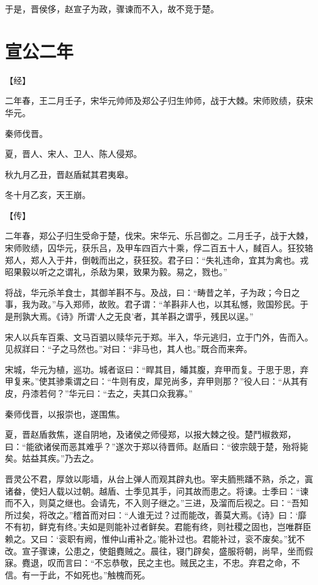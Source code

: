 \documentclass[a4paper,12pt,UTF8,twoside]{ctexbook}
\begin{document}
于是，晋侯侈，赵宣子为政，骤谏而不入，故不竞于楚。


\section{宣公二年}




【经】

二年春，王二月壬子，宋华元帅师及郑公子归生帅师，战于大棘。宋师败绩，获宋华元。

秦师伐晋。

夏，晋人、宋人、卫人、陈人侵郑。

秋九月乙丑，晋赵盾弑其君夷皋。

冬十月乙亥，天王崩。

【传】

二年春，郑公子归生受命于楚，伐宋。宋华元、乐吕御之。二月壬子，战于大棘，宋师败绩，囚华元，获乐吕，及甲车四百六十乘，俘二百五十人，馘百人。狂狡辂郑人，郑人入于井，倒戟而出之，获狂狡。君子曰：“失礼违命，宜其为禽也。戎昭果毅以听之之谓礼，杀敌为果，致果为毅。易之，戮也。”

将战，华元杀羊食士，其御羊斟不与。及战，曰：“畴昔之羊，子为政；今日之事，我为政。”与入郑师，故败。君子谓：“羊斟非人也，以其私憾，败国殄民。于是刑孰大焉。《诗》所谓‘人之无良’者，其羊斟之谓乎，残民以逞。”

宋人以兵车百乘、文马百驷以赎华元于郑。半入，华元逃归，立于门外，告而入。见叔牂曰：“子之马然也。”对曰：“非马也，其人也。”既合而来奔。

宋城，华元为植，巡功。城者讴曰：“睅其目，皤其腹，弃甲而复。于思于思，弃甲复来。”使其骖乘谓之曰：“牛则有皮，犀兕尚多，弃甲则那？”役人曰：“从其有皮，丹漆若何？”华元曰：“去之，夫其口众我寡。”

秦师伐晋，以报崇也，遂围焦。

夏，晋赵盾救焦，遂自阴地，及诸侯之师侵郑，以报大棘之役。楚鬥椒救郑，曰：“能欲诸侯而恶其难乎？”遂次于郑以待晋师。赵盾曰：“彼宗競于楚，殆将毙矣。姑益其疾。”乃去之。

晋灵公不君，厚敛以彫墙，从台上弹人而观其辟丸也。宰夫胹熊蹯不熟，杀之，寘诸畚，使妇人载以过朝。越盾、士季见其手，问其故而患之。将谏。士季曰：“谏而不入，则莫之继也。会请先，不入则子继之。”三进，及溜而后视之。曰：“吾知所过矣，将改之。”稽首而对曰：“人谁无过？过而能改，善莫大焉。《诗》曰：‘靡不有初，鲜克有终。’夫如是则能补过者鲜矣。君能有终，则社稷之固也，岂唯群臣赖之。又曰：‘衮职有阙，惟仲山甫补之。’能补过也。君能补过，衮不废矣。”犹不改。宣子骤谏，公患之，使鉏麑贼之。晨往，寝门辟矣，盛服将朝，尚早，坐而假寐。麑退，叹而言曰：“不忘恭敬，民之主也。贼民之主，不忠。弃君之命，不信。有一于此，不如死也。”触槐而死。
\end{document}

